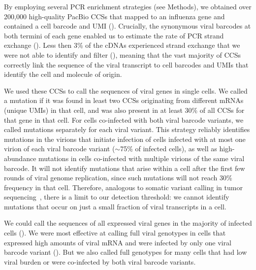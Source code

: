 \documentclass[9pt,lineno]{elife}
\begin{document}
By employing several PCR enrichment strategies (see Methods), we obtained over 200,000 high-quality PacBio CCSs that mapped to an influenza gene and contained a cell barcode and UMI ().
Crucially, the synonymous viral barcodes at both termini of each gene enabled us to estimate the rate of PCR strand exchange ().
Less then 3\% of the cDNAs experienced strand exchange that we were not able to identify and filter (), meaning that the vast majority of CCSs correctly link the sequence of the viral transcript to cell barcodes and UMIs that identify the cell and molecule of origin.

We used these CCSs to call the sequences of viral genes in single cells.
We called a mutation if it was found in least two CCSs originating from different mRNAs (unique UMIs) in that cell, and was also present in at least 30\% of all CCSs for that gene in that cell.
For cells co-infected with both viral barcode variants, we called mutations separately for each viral variant.
This strategy reliably identifies mutations in the virions that initiate infection of cells infected with at most one virion of each viral barcode variant ($\sim$75\% of infected cells), as well as high-abundance mutations in cells co-infected with multiple virions of the same viral barcode.
It will not identify mutations that arise within a cell after the first few rounds of viral genome replication, since such mutations will not reach 30\% frequency in that cell.
Therefore, analogous to somatic variant calling in tumor sequencing~\citep{xu2014comparison, cibulskis2013sensitive}, there is a limit to our detection threshold: we cannot identify mutations that occur on just a small fraction of viral transcripts in a cell. 

We could call the sequences of all expressed viral genes in the majority of infected cells ().
We were most effective at calling full viral genotypes in cells that expressed high amounts of viral mRNA and were infected by only one viral barcode variant ().
But we also called full genotypes for many cells that had low viral burden or were co-infected by both viral barcode variants.
\end{document}
